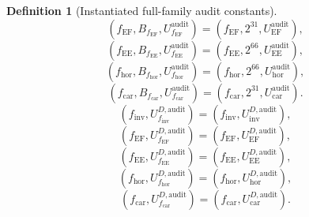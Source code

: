 ﻿\documentclass[11pt]{article}
\newtheorem{definition}[theorem]{Definition}
\begin{document}
\begin{definition}[Instantiated full-family audit constants]
\[\]
\[
(f_{\mathrm{EF}},B_{f_{\mathrm{EF}}},U_{f_{\mathrm{EF}}}^{\mathrm{audit}})
=(f_{\mathrm{EF}},2^{31},U_{\mathrm{EF}}^{\mathrm{audit}}),
\]
\[
(f_{\mathrm{EE}},B_{f_{\mathrm{EE}}},U_{f_{\mathrm{EE}}}^{\mathrm{audit}})
=(f_{\mathrm{EE}},2^{66},U_{\mathrm{EE}}^{\mathrm{audit}}),
\]
\[
(f_{\mathrm{hor}},B_{f_{\mathrm{hor}}},U_{f_{\mathrm{hor}}}^{\mathrm{audit}})
=(f_{\mathrm{hor}},2^{66},U_{\mathrm{hor}}^{\mathrm{audit}}),
\]
\[
(f_{\mathrm{car}},B_{f_{\mathrm{car}}},U_{f_{\mathrm{car}}}^{\mathrm{audit}})
=(f_{\mathrm{car}},2^{31},U_{\mathrm{car}}^{\mathrm{audit}}).
\]
\[
(f_{\mathrm{inv}},U_{f_{\mathrm{inv}}}^{D,\mathrm{audit}})
=(f_{\mathrm{inv}},U_{\mathrm{inv}}^{D,\mathrm{audit}}),
\]
\[
(f_{\mathrm{EF}},U_{f_{\mathrm{EF}}}^{D,\mathrm{audit}})
=(f_{\mathrm{EF}},U_{\mathrm{EF}}^{D,\mathrm{audit}}),
\]
\[
(f_{\mathrm{EE}},U_{f_{\mathrm{EE}}}^{D,\mathrm{audit}})
=(f_{\mathrm{EE}},U_{\mathrm{EE}}^{D,\mathrm{audit}}),
\]
\[
(f_{\mathrm{hor}},U_{f_{\mathrm{hor}}}^{D,\mathrm{audit}})
=(f_{\mathrm{hor}},U_{\mathrm{hor}}^{D,\mathrm{audit}}),
\]
\[
(f_{\mathrm{car}},U_{f_{\mathrm{car}}}^{D,\mathrm{audit}})
=(f_{\mathrm{car}},U_{\mathrm{car}}^{D,\mathrm{audit}}).
\]
\end{definition}
\end{document}
